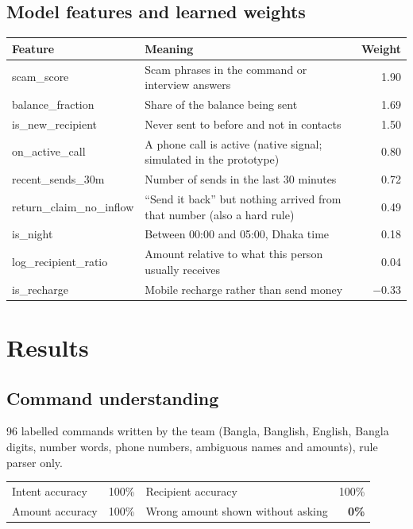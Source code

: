 \documentclass[11pt,a4paper]{article}
\begin{document}
\subsection{Model features and learned weights}
\begin{tabularx}{\textwidth}{@{}>{\ttfamily\small}p{46mm} X r@{}}
\toprule
\textnormal{\sffamily\small Feature} & \sffamily\small Meaning & \sffamily\small Weight\\
\midrule
scam\_score & Scam phrases in the command or interview answers & 1.90\\
balance\_fraction & Share of the balance being sent & 1.69\\
is\_new\_recipient & Never sent to before and not in contacts & 1.50\\
on\_active\_call & A phone call is active (native signal; simulated in the prototype) & 0.80\\
recent\_sends\_30m & Number of sends in the last 30 minutes & 0.72\\
return\_claim\_no\_inflow & ``Send it back'' but nothing arrived from that number (also a hard rule) & 0.49\\
is\_night & Between 00:00 and 05:00, Dhaka time & 0.18\\
log\_recipient\_ratio & Amount relative to what this person usually receives & 0.04\\
is\_recharge & Mobile recharge rather than send money & $-$0.33\\
\bottomrule
\end{tabularx}

\section{Results}

\subsection{Command understanding}
96 labelled commands written by the team (Bangla, Banglish, English, Bangla digits, number words, phone numbers, ambiguous names and amounts), rule parser only.

\begin{tabularx}{\textwidth}{@{}X r X r@{}}
\toprule
Intent accuracy & 100\% & Recipient accuracy & 100\%\\
Amount accuracy & 100\% & Wrong amount shown without asking & \textbf{0\%}\\
\bottomrule
\end{tabularx}
\end{document}
